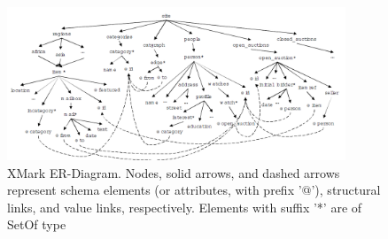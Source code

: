 \begin{figure}[H]
	\centering
	\includegraphics[width=0.90\textwidth]{img/xmark-schema-4}
	\caption{XMark ER-Diagram. Nodes, solid arrows, and dashed arrows represent schema elements (or attributes, with prefix '@'), structural links, and value links, respectively. Elements with suffix '*' are of SetOf type\citep{xmark/schema-sumerize}}
	\label{fig:xmark-schema}
\end{figure}

\label{xmark-queries}
